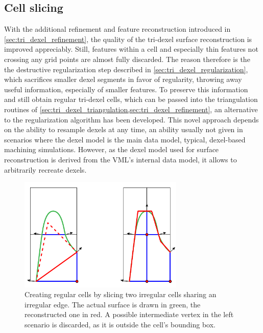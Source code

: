 \subsection{Cell slicing}
\label{sec:tri_dexel_cellslicing}

With the additional refinement and feature reconstruction introduced in \cref{sec:tri_dexel_refinement}, the quality of the tri-dexel surface reconstruction is improved appreciably.
Still, features within a cell and especially thin features not crossing any grid points are almost fully discarded.
The reason therefore is the the destructive regularization step described in \cref{sec:tri_dexel_regularization}, which sacrifices smaller dexel segments in favor of regularity, throwing away useful information, especially of smaller features.
To preserve this information and still obtain regular tri-dexel cells, which can be passed into the triangulation routines of \cref{sec:tri_dexel_triangulation,sec:tri_dexel_refinement}, an alternative to the regularization algorithm has been developed.
This novel approach depends on the ability to resample dexels at any time, an ability usually not given in scenarios where the dexel model is the main data model, \ie typical, dexel-based machining simulations.
However, as the dexel model used for surface reconstruction is derived from the VML's internal data model, it allows to arbitrarily recreate dexels.

\begin{figure}
	\centering
	\includegraphics[width=0.7\textwidth]{images/tri_dexel_cellslicing}
	\caption{
		Creating regular cells by slicing two irregular cells sharing an irregular edge.
		The actual surface is drawn in green, the reconstructed one in red.
		A possible intermediate vertex in the left scenario is discarded, as it is outside the cell's bounding box.
	}
	\label{fig:tri_dexel_cellslicing}
\end{figure}

